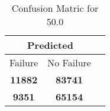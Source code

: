\begin{table}[] 
\caption{Confusion Matric for 50.0} 
\label{Table: Prediction Accuracy-DMD50.0OnlySunEKF-ignoreReflectionEKF-top2-Reflection} 
\centering 
\begin{tabular} 
 {@{}ccc@{}} 
\toprule 
\multicolumn{2}{c}{\textbf{Predicted}}
 \\ \midrule 
\multicolumn{1}{|c|}{Failure} & 
\multicolumn{1}{c|}{No Failure}
 \\ \midrule 
\multicolumn{1}{|c|}{\color{green}\textbf{11882}} & 
\multicolumn{1}{c|}{\color{green}\textbf{83741}}
 \\ \midrule 
\multicolumn{1}{|c|}{\color{red}\textbf{9351}} & 
\multicolumn{1}{c|}{\color{red}\textbf{65154}}
 \\ \bottomrule 
\end{tabular} 
\end{table} 
